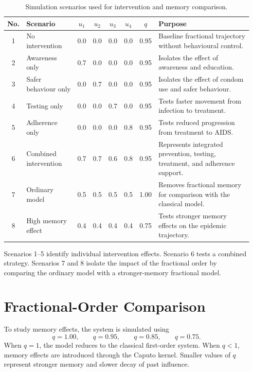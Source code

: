 \begin{table}[H]
\centering
\caption{Simulation scenarios used for intervention and memory comparison.}
\label{tab:simulation_scenarios_improved}
\small
\begin{tabularx}{\textwidth}{c l c c c c c X}
\toprule
No. & Scenario & $u_1$ & $u_2$ & $u_3$ & $u_4$ & $q$ & Purpose\\
\midrule
1 & No intervention & 0.0 & 0.0 & 0.0 & 0.0 & 0.95 & Baseline fractional trajectory without behavioural control.\\
2 & Awareness only & 0.7 & 0.0 & 0.0 & 0.0 & 0.95 & Isolates the effect of awareness and education.\\
3 & Safer behaviour only & 0.0 & 0.7 & 0.0 & 0.0 & 0.95 & Isolates the effect of condom use and safer behaviour.\\
4 & Testing only & 0.0 & 0.0 & 0.7 & 0.0 & 0.95 & Tests faster movement from infection to treatment.\\
5 & Adherence only & 0.0 & 0.0 & 0.0 & 0.8 & 0.95 & Tests reduced progression from treatment to AIDS.\\
6 & Combined intervention & 0.7 & 0.7 & 0.6 & 0.8 & 0.95 & Represents integrated prevention, testing, treatment, and adherence support.\\
7 & Ordinary model & 0.5 & 0.5 & 0.5 & 0.5 & 1.00 & Removes fractional memory for comparison with the classical model.\\
8 & High memory effect & 0.4 & 0.4 & 0.4 & 0.4 & 0.75 & Tests stronger memory effects on the epidemic trajectory.\\
\bottomrule
\end{tabularx}
\end{table}

\begin{scenariobox}[title={Scenario interpretation}]
Scenarios 1--5 identify individual intervention effects. Scenario 6 tests a combined strategy. Scenarios 7 and 8 isolate the impact of the fractional order by comparing the ordinary model with a stronger-memory fractional model.
\end{scenariobox}

\section{Fractional-Order Comparison}

To study memory effects, the system is simulated using
\[
q=1.00,\qquad q=0.95,\qquad q=0.85,\qquad q=0.75.
\]
When $q=1$, the model reduces to the classical first-order system. When $q<1$, memory effects are introduced through the Caputo kernel. Smaller values of $q$ represent stronger memory and slower decay of past influence.

